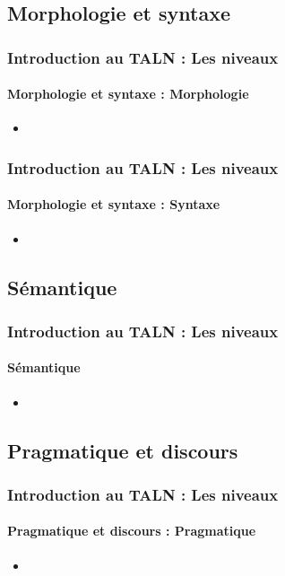\documentclass{beamer}
\begin{document}
\subsection{Morphologie et syntaxe}

\begin{frame}
\frametitle{Introduction au TALN : Les niveaux}
\framesubtitle{Morphologie et syntaxe : Morphologie}

\begin{itemize}
	\item 
\end{itemize}

\end{frame}

\begin{frame}
\frametitle{Introduction au TALN : Les niveaux}
\framesubtitle{Morphologie et syntaxe : Syntaxe}

\begin{itemize}
	\item 
\end{itemize}

\end{frame}

\subsection{Sémantique}

\begin{frame}
\frametitle{Introduction au TALN : Les niveaux}
\framesubtitle{Sémantique}

\begin{itemize}
	\item 
\end{itemize}

\end{frame}

\subsection{Pragmatique et discours}

\begin{frame}
\frametitle{Introduction au TALN : Les niveaux}
\framesubtitle{Pragmatique et discours : Pragmatique}

\begin{itemize}
	\item 
\end{itemize}

\end{frame}
\end{document}

